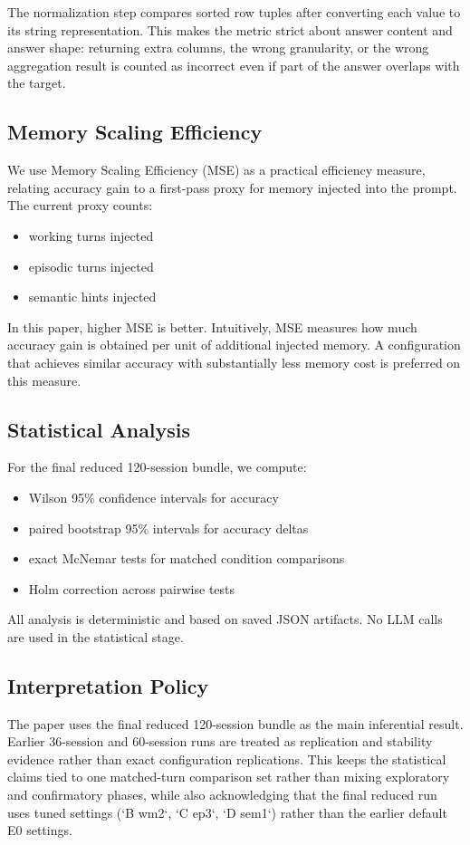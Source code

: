 \documentclass[11pt]{article}
\begin{document}
The normalization step compares sorted row tuples after converting each value to its string representation. This makes the metric strict about answer content and answer shape: returning extra columns, the wrong granularity, or the wrong aggregation result is counted as incorrect even if part of the answer overlaps with the target.

\subsection{Memory Scaling Efficiency}
We use Memory Scaling Efficiency (MSE) as a practical efficiency measure, relating accuracy gain to a first-pass proxy for memory injected into the prompt. The current proxy counts:
\begin{itemize}[leftmargin=1.5em]
  \item working turns injected
  \item episodic turns injected
  \item semantic hints injected
\end{itemize}

In this paper, higher MSE is better. Intuitively, MSE measures how much accuracy gain is obtained per unit of additional injected memory. A configuration that achieves similar accuracy with substantially less memory cost is preferred on this measure.

\subsection{Statistical Analysis}
For the final reduced 120-session bundle, we compute:
\begin{itemize}[leftmargin=1.5em]
  \item Wilson 95\% confidence intervals for accuracy
  \item paired bootstrap 95\% intervals for accuracy deltas
  \item exact McNemar tests for matched condition comparisons
  \item Holm correction across pairwise tests
\end{itemize}

All analysis is deterministic and based on saved JSON artifacts. No LLM calls are used in the statistical stage.

\subsection{Interpretation Policy}
The paper uses the final reduced 120-session bundle as the main inferential result. Earlier 36-session and 60-session runs are treated as replication and stability evidence rather than exact configuration replications. This keeps the statistical claims tied to one matched-turn comparison set rather than mixing exploratory and confirmatory phases, while also acknowledging that the final reduced run uses tuned settings (`B wm2`, `C ep3`, `D sem1`) rather than the earlier default E0 settings.
\end{document}
